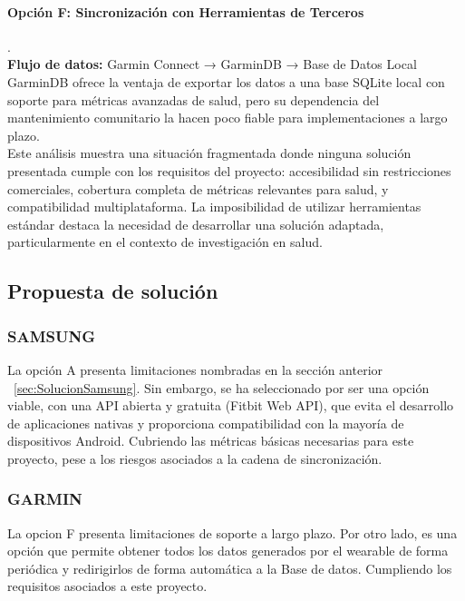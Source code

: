 \paragraph{Opción F: Sincronización con Herramientas de Terceros} . \\
\textbf{Flujo de datos: } Garmin Connect → GarminDB → Base de Datos Local \\
GarminDB ofrece la ventaja de exportar los datos a una base SQLite local con soporte para métricas avanzadas de salud, pero su dependencia del mantenimiento comunitario la hacen poco fiable para implementaciones a largo plazo.\\


 Este análisis muestra una situación fragmentada donde ninguna solución presentada cumple con los requisitos del proyecto: accesibilidad sin restricciones comerciales, cobertura completa de métricas relevantes para salud, y compatibilidad multiplataforma. La imposibilidad de utilizar herramientas estándar destaca la necesidad de desarrollar una solución adaptada, particularmente en el contexto de investigación en salud.




\subsection{Propuesta de solución}
\subsubsection{SAMSUNG}
La opción A presenta  limitaciones nombradas en la sección anterior ~\ref{sec:SolucionSamsung}. Sin embargo, se ha seleccionado por ser una opción viable, con una API abierta y gratuita (Fitbit Web API), que evita el desarrollo de aplicaciones nativas y proporciona compatibilidad con la mayoría de dispositivos Android. Cubriendo las métricas básicas necesarias para este proyecto, pese a los riesgos asociados a la cadena de sincronización.
\subsubsection{GARMIN}
La opcion F presenta limitaciones de soporte a largo plazo. Por otro lado, es una opción que permite obtener todos los datos generados por el wearable de forma periódica y redirigirlos de forma automática a la Base de datos. Cumpliendo los requisitos asociados a este proyecto.


